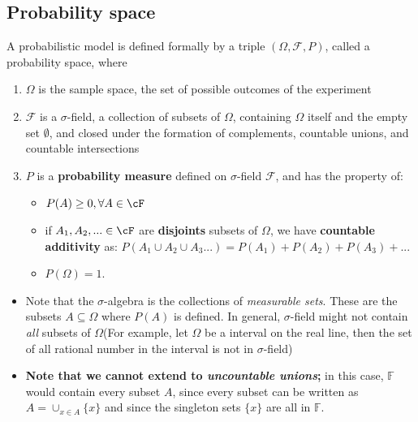 \begin{refsection}
\subsection{Probability space}
\begin{definition}\cite{rosenthal2006first}\label{ch:theory-of-probability:def:ProbabilitySpace}
A probabilistic model is defined formally by a triple $(\Omega, \mathcal{F}, P)$, called a probability space, where
\begin{enumerate}
\item $\Omega$ is the sample space, the set of possible outcomes of the experiment
\item $\mathcal{F}$ is a $\sigma$-field, a collection of subsets of $\Omega$, containing $\Omega$ itself and the empty set $\emptyset$, and closed under the formation of complements, countable unions, and countable intersections
\item $P$ is a \textbf{probability measure }defined on  $\sigma$-field $\mathcal{F}$, and has the property of: 
\begin{itemize}
\item $P(A)\geq 0, \forall A\in \cF$
\item if $A_1,A_2,... \in \cF$ are \textbf{disjoints} subsets of $\Omega$, we have \textbf{countable additivity} as:
$P(A_1\cup A_2 \cup A_3 ...) = P(A_1) + P(A_2) + P(A_3) + ...$
\item $P({\Omega}) = 1$.
\end{itemize}
\end{enumerate}
\end{definition}


\begin{remark}[interpretation]\hfill
\begin{itemize}
	\item Note that the $\sigma$-algebra is the collections of \emph{measurable sets}. These are the subsets $A \subseteq \Omega$ where $P(A)$ is defined. In general, $\sigma$-field might not contain \emph{all} subsets of $\Omega$(For example, let $\Omega$ be a interval on the real line, then the set of all rational number in the interval is not in $\sigma$-field)
	\item \textbf{Note that we cannot extend to \emph{uncountable unions};} in this case, $\mathbb{F}$ would contain every subset $A$, since every subset can be written as $A = \cup_{x\in A} \{x\} $ and since the singleton sets $\{x\}$ are all in $\mathbb{F}$.
\end{itemize}
\end{remark}



\end{refsection}
